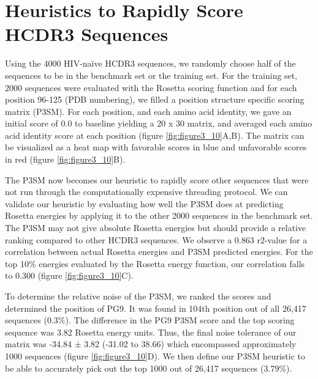 \section{Heuristics to Rapidly Score HCDR3 Sequences}
Using the 4000 HIV-naïve HCDR3 sequences, we randomly choose half of the sequences to be in the benchmark set or the training set. For the training set, 2000 sequences were evaluated with the Rosetta scoring function and for each position 96-125 (PDB numbering), we filled a position structure specific scoring matrix (P3SM). For each position, and each amino acid identity, we gave an initial score of 0.0 to baseline yielding a 20 x 30 matrix, and averaged each amino acid identity score at each position (figure \ref{fig:figure3_10}A,B). The matrix can be visualized as a heat map with favorable scores in blue and unfavorable scores in red (figure \ref{fig:figure3_10}B).

The P3SM now becomes our heuristic to rapidly score other sequences that were not run through the computationally expensive threading protocol. We can validate our heuristic by evaluating how well the P3SM does at predicting Rosetta energies by applying it to the other 2000 sequences in the benchmark set. The P3SM may not give absolute Rosetta energies but should provide a relative ranking compared to other HCDR3 sequences. We observe a 0.863 r2-value for a correlation between actual Rosetta energies and P3SM predicted energies. For the top 10\% energies evaluated by the Rosetta energy function, our correlation falls to 0.300 (figure \ref{fig:figure3_10}C).

To determine the relative noise of the P3SM, we ranked the scores and determined the position of PG9. It was found in 104th position out of all 26,417 sequences (0.3\%). The difference in the PG9 P3SM score and the top scoring sequence was 3.82 Rosetta energy units. Thus, the final noise tolerance of our matrix was -34.84 ± 3.82 (-31.02 to 38.66) which encompassed approximately 1000 sequences (figure \ref{fig:figure3_10}D). We then define our P3SM heuristic to be able to accurately pick out the top 1000 out of 26,417 sequences (3.79\%).

